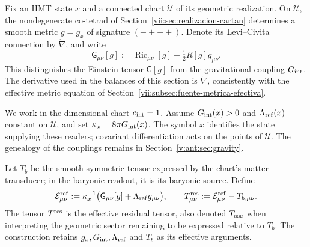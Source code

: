 Fix an HMT state \(x\) and a connected chart \(\mathcal U\) of
its geometric realization. On \(\mathcal U\), the nondegenerate
co-tetrad of Section~\ref{vii:sec:realizacion-cartan} determines a
smooth metric \(g=g_x\) of signature \((-+++)\). Denote its
Levi--Civita connection by \(\mathring\nabla\), and write
\[
 \mathsf G_{\mu\nu}[g]
 :=\operatorname{Ric}_{\mu\nu}[g]-\tfrac12R[g]g_{\mu\nu}.
\]
This distinguishes the Einstein tensor \(\mathsf G[g]\) from
the gravitational coupling \(G_{\rm int}\). The derivative used
in the balances of this section is \(\mathring\nabla\),
consistently with the effective metric equation of
Section~\ref{vii:subsec:fuente-metrica-efectiva}.

We work in the dimensional chart \(c_{\rm int}=1\). Assume
\(G_{\rm int}(x)>0\) and \(\Lambda_{\rm ref}(x)\) constant
on \(\mathcal U\), and set \(\kappa_x=8\pi G_{\rm int}(x)\).
The symbol \(x\) identifies the state supplying these readers;
covariant differentiation acts on the points of \(\mathcal U\).
The genealogy of the couplings remains in
Section~\ref{v:ant:sec:gravity}.

Let \(T_b\) be the smooth symmetric tensor expressed by the chart's
matter transducer; in the baryonic readout, it is its baryonic source.
Define
\begin{equation}
 \mathcal E^{\rm ref}_{\mu\nu}
 :=\kappa_x^{-1}\bigl(\mathsf G_{\mu\nu}[g]
                            +\Lambda_{\rm ref}g_{\mu\nu}\bigr),
 \qquad
 T^{\rm res}_{\mu\nu}:=\mathcal E^{\rm ref}_{\mu\nu}-T_{b,\mu\nu}.
 \label{vii:eq:residual-definicion}
\end{equation}
The tensor \(T^{\rm res}\) is the effective residual tensor,
also denoted \(T_{\rm osc}\) when interpreting the geometric
sector remaining to be expressed relative to \(T_b\). The
construction retains \(g_x,G_{\rm int},\Lambda_{\rm ref}\) and
\(T_b\) as its effective arguments.

